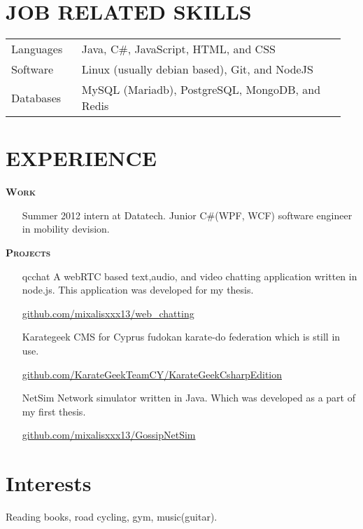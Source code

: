 \documentclass[margin, 10pt]{res} %
\begin{document}
\begin{resume}
\begin{tabular}{p{0.2\linewidth} p{0.75\linewidth}}
\end{tabular} 


\section{JOB RELATED SKILLS}

\begin{tabular}{p{0.2\linewidth} p{0.75\linewidth}}

Languages & Java, C\#, JavaScript, HTML, and CSS					\\
Software & Linux (usually debian based), Git, and NodeJS 				\\
Databases & MySQL (Mariadb), PostgreSQL, MongoDB, and Redis 	

\end{tabular} 
 
 
 
\section{EXPERIENCE} 

\textsc{ \textbf{Work}}

\begin{itemize}
\item[Summer 2012 intern] at Datatech. Junior C\#(WPF, WCF) software engineer in mobility devision. 
\end{itemize}

\textsc{ \textbf{Projects}}

\begin{itemize}

\item[qcchat] A webRTC based text,audio, and video chatting application written in node.js.
This application was developed for my thesis.

\href{https://github.com/mixalisxxx13/web_chatting}{github.com/mixalisxxx13/web\_chatting} 		\\



\item[Karategeek] CMS for Cyprus fudokan karate-do federation which is still in use. 

\href{https://github.com/KarateGeekTeamCY/KarateGeekCsharpEdition/tree/baseV4.5.1}{github.com/KarateGeekTeamCY/KarateGeekCsharpEdition} \\



\item[NetSim] Network simulator written in Java. 
Which was developed as a part of my first thesis.

\href{https://github.com/mixalisxxx13/GossipNetSim}{github.com/mixalisxxx13/GossipNetSim} 

\end{itemize}


\section{Interests}

Reading books, road cycling, gym, music(guitar). 

 


\end{resume}
\end{document}
